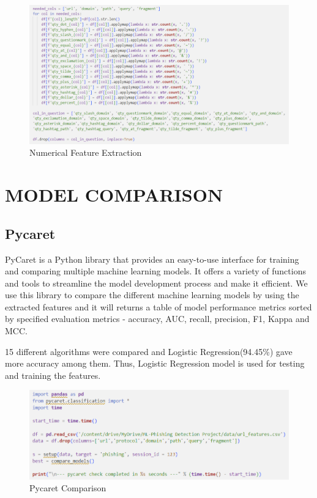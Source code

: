 \begin{figure}[H]
\centerline{\includegraphics[scale=0.55]{featureExtraction_Code2.png}}
\caption{Numerical Feature Extraction}
\label{fig}
\end{figure}


\section{MODEL COMPARISON}
\subsection{Pycaret}
\par PyCaret is a Python library that provides an easy-to-use interface for training and comparing multiple machine learning models. It offers a variety of functions and tools to streamline the model development process and make it efficient. We use this library to compare the different machine learning models by using the extracted features and it will returns a table of model performance metrics sorted by  specified evaluation metrics - accuracy, AUC, recall, precision, F1, Kappa and MCC.

\par 15 different algorithms were compared and Logistic Regression(94.45\%) gave more accuracy among them. Thus, Logistic Regression model is used for testing and training the features. 
\begin{figure}[H]
\centerline{\includegraphics[scale=0.6]{pycaretCode.png}}
\caption{Pycaret Comparison}
\label{fig}
\end{figure}



